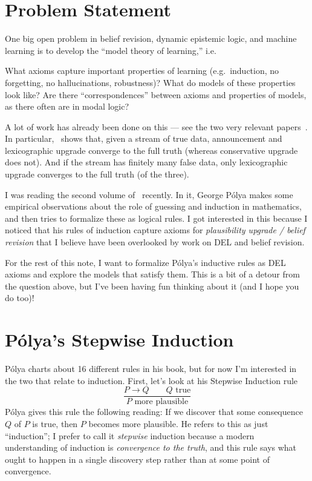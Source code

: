 \documentclass[letterpaper]{article}
\begin{document}
\section*{Problem Statement}

One big open problem in belief revision, dynamic epistemic logic, and machine learning is to develop the ``model theory of learning,'' i.e.

\begin{question}
    What axioms capture important properties of learning (e.g.\ induction, no forgetting, no hallucinations, robustness)? What do models of these properties look like? Are there “correspondences” between axioms and properties of models, as there often are in modal logic?
\end{question}

A lot of work has already been done on this --- see the two very relevant papers~\cite{truthtracking, dellearningtheory}.  In particular,~\cite{truthtracking} shows that, given a stream of true data, announcement and lexicographic upgrade converge to the full truth (whereas conservative upgrade does not).  And if the stream has finitely many false data, only lexicographic upgrade converges to the full truth (of the three).

I was reading the second volume of~\cite{polya1954mathematics} recently.  In it, George P\'{o}lya makes some empirical observations about the role of guessing and induction in mathematics, and then tries to formalize these as logical rules.  I got interested in this because I noticed that his rules of induction capture axioms for \emph{plausibility upgrade / belief revision} that I believe have been overlooked by work on DEL and belief revision.

For the rest of this note, I want to formalize P\'{o}lya's inductive rules as DEL axioms and explore the models that satisfy them.  This is a bit of a detour from the question above, but I've been having fun thinking about it (and I hope you do too)!

\section*{P\'{o}lya's Stepwise Induction}

P\'{o}lya charts about 16 different rules in his book, but for now I'm interested in the two that relate to induction.  First, let's look at his Stepwise Induction rule
\[
    \frac{P \to Q \quad \quad Q \mbox{ true}}{P \mbox{ more plausible}}
\]
P\'{o}lya gives this rule the following reading: If we discover that some consequence $Q$ of $P$ is true, then $P$ becomes more plausible.  He refers to this as just ``induction''; I prefer to call it \emph{stepwise} induction because a modern understanding of induction is \emph{convergence to the truth}, and this rule says what ought to happen in a single discovery step rather than at some point of convergence.
\end{document}

